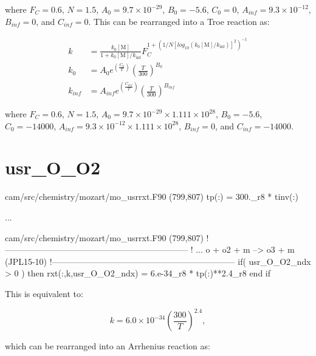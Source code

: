 \documentclass[titlepage]{article}
\begin{document}
\noindent where $F_C = 0.6$, $N = 1.5$, $A_0 = 9.7 \times 10^{-29}$, $B_0 = -5.6$, $C_0 = 0$, $A_{inf} = 9.3 \times 10^{-12}$, $B_{inf} = 0$, and $C_{inf} = 0$. This can be rearranged into a Troe reaction as:

\begin{equation}
\begin{split}
k & = \frac{k_0[\mbox{M}]}{1+k_0[\mbox{M}]/k_{\inf}}F_C^{1+(1/N[log_{10}(k_0[\mbox{M}]/k_{\inf})]^2)^{-1}} \\
k_0 & = A_0 e^{\left( \frac{C_0}{T} \right)} \left( \frac{T}{300} \right)^{B_0} \\
k_{inf} & = A_{inf} e^{\left( \frac{C_{inf}}{T} \right)} \left( \frac{T}{300} \right)^{B_{inf}}
\end{split}
\end{equation}

\noindent where $F_C = 0.6$, $N = 1.5$, $A_0 = 9.7 \times 10^{-29} \times 1.111 \times 10^{28}$, $B_0 = -5.6$, $C_0 = -14000$, $A_{inf} = 9.3 \times 10^{-12} \times 1.111 \times 10^{28}$, $B_{inf} = 0$, and $C_{inf} = -14000$.


\section{usr\_O\_O2}

\begin{blockcode}[commandchars=\\\{\}]
\color{gray}cam/src/chemistry/mozart/mo_usrrxt.F90 (799,807)
       tp(:)             = 300._r8 * tinv(:)

\color{gray}...

\color{gray}cam/src/chemistry/mozart/mo_usrrxt.F90 (799,807)
!-----------------------------------------------------------------
! ... o + o2 + m --> o3 + m (JPL15-10)
!-----------------------------------------------------------------
       if( usr_O_O2_ndx > 0 ) then
          rxt(:,k,usr_O_O2_ndx) = 6.e-34_r8 * tp(:)**2.4_r8
       end if
\end{blockcode}

This is equivalent to:

\begin{equation}
k = 6.0 \times 10^{-34} \left(\frac{300}{T}\right)^{2.4},
\end{equation}

\noindent which can be rearranged into an Arrhenius reaction as:
\end{document}
